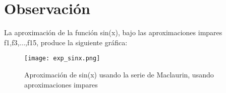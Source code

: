 \documentclass[12pt,a4paper,twoside]{article}
\begin{document}
\section{Observación}
La aproximación de la función sin(x), bajo las aproximaciones impares f1,f3,...,f15, produce la siguiente gráfica:
\begin{figure}[htbp]
\centering
\texttt{[image: exp\_sinx.png]}
\caption{Aproximación de sin(x) usando la serie de Maclaurin, usando aproximaciones impares}\label{fig:figura3}
\end{figure}
\end{document}
